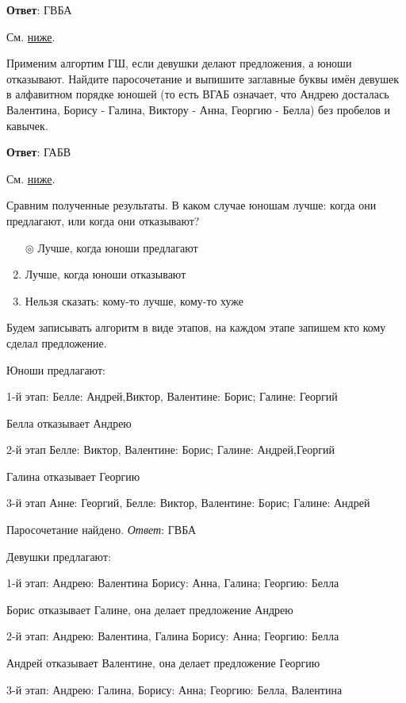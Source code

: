 	\textbf{Ответ}: ГВБА
	
	\solution См. \hyperref[week7-models:train:marriage]{ниже}.
	
	\task
	Применим алгортим ГШ, если девушки делают предложения, а юноши отказывают. Найдите паросочетание и выпишите заглавные буквы имён девушек в алфавитном порядке юношей (то есть ВГАБ означает, что Андрею досталась Валентина, Борису - Галина, Виктору - Анна, Георгию - Белла) без пробелов и кавычек.
	
	\textbf{Ответ}: ГАБВ
	
	\solution См. \hyperref[week7-models:train:marriage]{ниже}.
	
	\task
	Сравним полученные результаты. В каком случае юношам лучше: когда они предлагают, или когда они отказывают?
	\begin{enumerate}[label=$\circ$]
		\item[$\circledcirc$] Лучше, когда юноши предлагают
		\item Лучше, когда юноши отказывают
		\item Нельзя сказать: кому-то лучше, кому-то хуже
	\end{enumerate}

	\solution
	\label{week7-models:train:marriage}
	Будем записывать алгоритм в виде этапов, на каждом этапе запишем кто кому сделал предложение.
	
	Юноши предлагают:
	
	1-й этап: Белле: Андрей,Виктор, Валентине: Борис; Галине: Георгий
	
	Белла отказывает Андрею
	
	2-й этап Белле: Виктор, Валентине: Борис; Галине: Андрей,Георгий
	
	Галина отказывает Георгию
	
	3-й этап Анне: Георгий, Белле: Виктор, Валентине: Борис; Галине: Андрей
	
	Паросочетание найдено. \textit{Ответ}: ГВБА
	
	Девушки предлагают:
	
	1-й этап: Андрею: Валентина Борису: Анна, Галина; Георгию: Белла
	
	Борис отказывает Галине, она делает предложение Андрею
	
	2-й этап: Андрею: Валентина, Галина Борису: Анна; Георгию: Белла
	
	Андрей отказывает Валентине, она делает предложение Георгию
	
	3-й этап: Андрею: Галина, Борису: Анна; Георгию: Белла, Валентина
	
